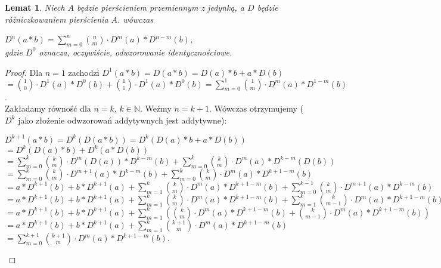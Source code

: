 \documentclass[12pt,a4paper]{article}
\newtheorem{lem}[twr]{Lemat}
\numberwithin{equation}{section}
\begin{document}
\begin{lem}
Niech $A$ będzie pierścieniem przemiennym z jedynką, a $D$ będzie różniczkowaniem pierścienia $A$. wówczas 
\begin{flushleft}
$\displaystyle D^n(a*b)=\sum_{m=0}^n \binom{n}{m}\cdot D^m(a)*D^{n-m}(b)$,\\
gdzie $D^0$ oznacza, oczywiście, odwzorowanie identycznościowe.
\end{flushleft}
\end{lem}
\begin{proof}
Dla $n=1$ zachodzi
$D^1(a*b)=D(a*b)=D(a)*b+a*D(b)$\\$
\displaystyle=\binom{1}{0}\cdot D^1(a)*D^0(b)+\binom{1}{1}\cdot D^1(a)*D^0(b)
=\sum_{m=0}^1 \binom{1}{m}\cdot D^m(a)*D^{1-m}(b)$. 
\\Zakładamy równość dla $n=k$, $k\in \mathbb{N}$. Weźmy $n=k+1$. Wówczas otrzymujemy ($D^k$ jako złożenie odwzorowań addytywnych jest addytywne):
\begin{flushleft}
$D^{k+1}(a*b)=D^k(D(a*b))=D^k(D(a)*b+a*D(b))$\\$
\displaystyle=D^k(D(a)*b)+D^k(a*D(b))$\\$
\displaystyle=\sum_{m=0}^k \binom{k}{m}\cdot D^m(D(a))*D^{k-m}(b)+
\sum_{m=0}^k \binom{k}{m}\cdot D^m(a)*D^{k-m}(D(b))$\\$
\displaystyle=\sum_{m=0}^k \binom{k}{m}\cdot D^{m+1}(a)*D^{k-m}(b)+
\sum_{m=0}^k \binom{k}{m}\cdot D^m(a)*D^{k+1-m}(b)$\\$
\displaystyle =a*D^{k+1}(b)+b*D^{k+1}(a)+\sum_{m=1}^{k} \binom{k}{m}\cdot D^m(a)*D^{k+1-m}(b)+
\sum_{m=0}^{k-1}\binom{k}{m}\cdot D^{m+1}(a)*D^{k-m}(b)$\\$
\displaystyle =a*D^{k+1}(b)+b*D^{k+1}(a)+\sum_{m=1}^{k} \binom{k}{m}\cdot D^m(a)*D^{k+1-m}(b)+ 
\sum_{m=1}^{k}\binom{k}{m-1}\cdot D^m(a)*D^{k+1-m}(b)$\\$
\displaystyle =a*D^{k+1}(b)+b*D^{k+1}(a)+\sum_{m=1}^{k}( \binom{k}{m}\cdot D^m(a)*D^{k+1-m}(b)+
\binom{k}{m-1}\cdot D^m(a)*D^{k+1-m}(b))$\\$
=a*D^{k+1}(b)+b*D^{k+1}(a)+\sum_{m=1}^{k} \binom{k+1}{m}\cdot D^m(a)*D^{k+1-m}(b)$\\$
\displaystyle =\sum_{m=0}^{k+1} \binom{k+1}{m}\cdot D^m(a)*D^{k+1-m}(b)$.
\end{flushleft}
\end{proof}
\end{document}
